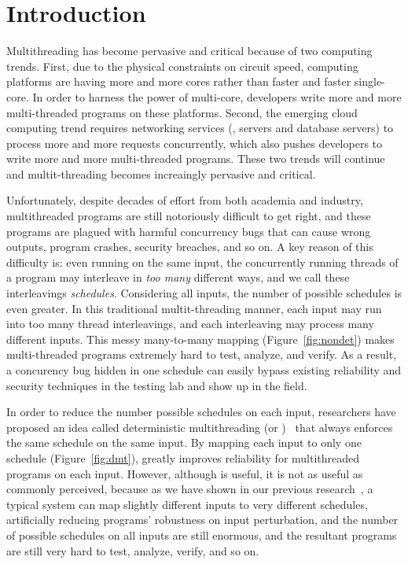 \chapter{Introduction} \label{sec:intro}

Multithreading has become pervasive and critical because of two computing trends. First, due to the physical constraints on circuit speed, computing platforms are having more and more cores rather than faster and faster single-core. In order to harness the power of multi-core, developers write more and more multi-threaded programs on these platforms. Second, the emerging cloud computing trend requires networking services (\eg, \http servers and database servers) to process more and more requests concurrently, which also pushes developers to write more and more multi-threaded programs. These two trends will continue and 
multit-threading becomes increaingly pervasive and critical.

Unfortunately, despite decades of effort from both academia and industry, multithreaded programs are still notoriously difficult to get right, and these programs are plagued with harmful concurrency bugs that can cause wrong outputs, program crashes, security breaches, and so on. A key reason of this difficulty is: even running on the same input, the concurrently running threads of a program may interleave in \emph{too many} different ways, and we call these interleavings \emph{schedules}. Considering all inputs, the number of possible schedules is even greater. In this traditional multit-threading manner, each input may run into too many thread interleavings, and each interleaving may process many different inputs. This messy many-to-many mapping (Figure~\ref{fig:nondet}) makes multi-threaded programs extremely hard to test, analyze, and verify. As a result, a concurency bug hidden in one schedule can easily bypass existing reliability and security techniques in the testing lab and show up in the field.

In order to reduce the number possible schedules on each input, researchers have proposed an idea called deterministic multithreading (or \dmt)~\cite{dthreads:sosp11, dpj:oopsla09, dmp:asplos09, kendo:asplos09, coredet:asplos10} that always enforces the same schedule on the same input. By mapping each input to only one schedule (Figure~\ref{fig:dmt}), \dmt greatly improves reliability for multithreaded programs on each input. However, although \dmt is useful, it is not as useful as commonly perceived, because as we have shown in our previous research~\cite{cui:tern:osdi10}, a typical \dmt system can map slightly different inputs to very different schedules, artificially reducing programs' robustness on input perturbation, and the number of possible schedules on all inputs are still enormous, and the resultant programs are still very hard to test, analyze, verify, and so on.

